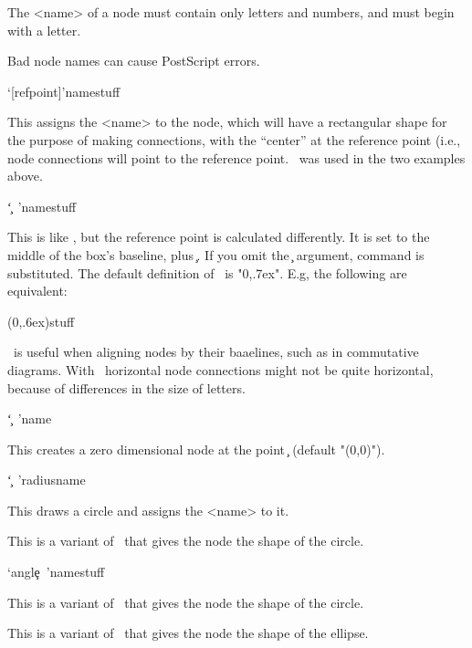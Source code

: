 

The <name> of a node must contain only letters and numbers, and must begin
with a letter.

\begin{Warning}
Bad node names can cause PostScript errors.
\end{Warning}

\begin{description}

\mitem  \rnode`[refpoint]'{name}{stuff}

  This assigns the <name> to the node, which will have a rectangular shape for
the purpose of making connections, with the ``center'' at the reference point
(i.e., node connections will point to the reference point. \n\rnode\ was used
in the two examples above.

\mitem  \Rnode`\c~'{name}{stuff}

  This is like \n\rnode, but the reference point is calculated differently. It
is set to the middle of the box's baseline, plus \c{}. If you omit the \c{}
argument, command
  \Mac  \RnodeRef
is substituted. The default definition of \n\RnodeRef\ is "0,.7ex". E.g, the
following are equivalent:
\begin{LVerb}
  \Rnode(0,.6ex){stuff}
  {\def\RnodeRef{0,.6ex}}
\end{LVerb}

\n\Rnode\ is useful when aligning nodes by their baaelines, such as in
commutative diagrams. With \n\rnode\, horizontal node connections might not be
quite horizontal, because of differences in the size of letters.

\mitem  \pnode`\c~'{name}

  This creates a zero dimensional node at the point \c{} (default "(0,0)").

\oitem  \cnode`\c~'{radius}{name}

  This draws a circle and assigns the <name> to it.

\oitem  {}

  This is a variant of \n\pscirclebox\ that gives the node the shape of the
circle.

\oitem  \cnodeput`{angle}\c~'{name}{stuff}

  This is a variant of \n\cput\ that gives the node the shape of the circle.

\oitem  {}

  This is a variant of \n\psovalbox\ that gives the node the shape of the
ellipse.

\end{description}

